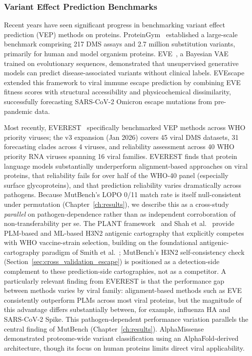 \subsubsection*{Variant Effect Prediction Benchmarks}

Recent years have seen significant progress in benchmarking variant effect prediction (VEP) methods on proteins. ProteinGym~\cite{notin2023proteingym} established a large-scale benchmark comprising 217 DMS assays and 2.7 million substitution variants, primarily for human and model organism proteins. EVE~\cite{frazer2021eve}, a Bayesian VAE trained on evolutionary sequences, demonstrated that unsupervised generative models can predict disease-associated variants without clinical labels. EVEscape~\cite{thadani2023evescape} extended this framework to viral immune escape prediction by combining EVE fitness scores with structural accessibility and physicochemical dissimilarity, successfully forecasting SARS-CoV-2 Omicron escape mutations from pre-pandemic data.

Most recently, EVEREST~\cite{gurev2025everest,gurev2026everest_v3} specifically benchmarked VEP methods across WHO priority viruses; the v3 expansion (Jan 2026) covers 45 viral DMS datasets, 31 forecasting clades across 4 viruses, and reliability assessment across 40 WHO priority RNA viruses spanning 16 viral families. EVEREST finds that protein language models substantially underperform alignment-based approaches on viral proteins, that reliability fails for over half of the WHO-40 panel (especially surface glycoproteins), and that prediction reliability varies dramatically across pathogens. Because MutBench's LOPO 0/11 match rate is itself null-consistent under permutation (Chapter~\ref{ch:results}), we describe this as a cross-study \emph{parallel} on pathogen-dependence rather than as independent corroboration of non-transferability per se.
The PLANT framework~\cite{plant2025antigenic} and Shah et al.~\cite{shah2024h3n2ml} provide PLM-based and ML-based H3N2 antigenic cartography that explicitly competes with WHO vaccine-strain selection, building on the foundational antigenic-cartography paradigm of Smith et al.~\cite{smith2004antigenic}; MutBench's H3N2 self-consistency check (Section~\ref{sec:cross_validation_escape}) is positioned as a detection-side complement to these prediction-side cartographies, not as a competitor.
A particularly relevant finding from EVEREST is that the performance gap between methods varies by viral family: alignment-based methods such as EVE consistently outperform PLMs across most viral proteins, but the magnitude of this advantage differs substantially between, for example, influenza HA and SARS-CoV-2 Spike.
This pathogen-dependent performance variation parallels the central finding of MutBench (Chapter~\ref{ch:results}).
AlphaMissense~\cite{cheng2023alphamissense} demonstrated proteome-wide variant classification using an AlphaFold-derived architecture, though its focus on human proteins limits direct viral applicability.

